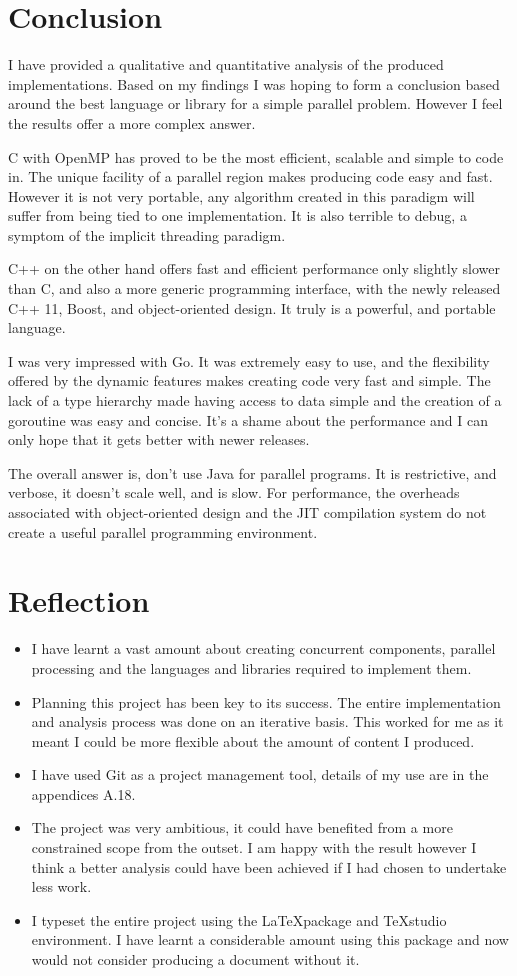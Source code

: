\documentclass[11pt]{article} %
\begin{document}
\section{Conclusion}
I have provided a qualitative and quantitative analysis of the produced implementations. Based on my findings I was hoping to form a conclusion based around the best language or library for a simple parallel problem. However I feel the results offer a more complex answer.

C with OpenMP has proved to be the most efficient, scalable and simple to code in. The unique facility of a parallel region makes producing code easy and fast. However it is not very portable, any algorithm created in this paradigm will suffer from being tied to one implementation. It is also terrible to debug, a symptom of the implicit threading paradigm.

C++ on the other hand offers fast and efficient performance only slightly slower than C, and also a more generic programming interface, with the newly released C++ 11, Boost, and object-oriented design. It truly is a powerful, and portable language.

I was very impressed with Go. It was extremely easy to use, and the flexibility offered by the dynamic features makes creating code very fast and simple. The lack of a type hierarchy made having access to data simple and the creation of a goroutine was easy and concise. It's a shame about the performance and I can only hope that it gets better with newer releases.

The overall answer is, don't use Java for parallel programs. It is restrictive, and verbose, it doesn't scale well, and is slow. For performance, the overheads associated with object-oriented design and the JIT compilation system do not create a useful parallel programming environment. 

\section*{Reflection}
\begin{itemize}
\item I have learnt a vast amount about creating concurrent components, parallel processing and the languages and libraries required to implement them.
\item  Planning this project has been key to its success. The entire implementation and analysis process was done on an iterative basis. This worked for me as it meant I could be more flexible about the amount of content I produced.
\item I have used Git as a project management tool, details of my use are in the appendices A.18.
\item The project was very ambitious, it could have benefited from a more constrained scope from the outset. I am happy with the result however I think a better analysis could have been achieved if I had chosen to undertake less work.
\item I typeset the entire project using the \LaTeX package and TeXstudio environment. I have learnt a considerable amount using this package and now would not consider producing a document without it.
\end{itemize}
\end{document}

